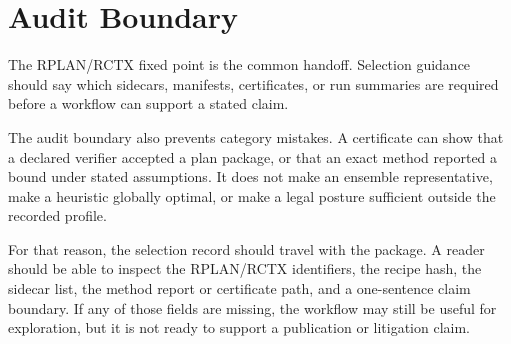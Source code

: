 \section{Audit Boundary}

The RPLAN/RCTX fixed point is the common handoff. Selection guidance should say
which sidecars, manifests, certificates, or run summaries are required before a
workflow can support a stated claim.

The audit boundary also prevents category mistakes. A certificate can show that
a declared verifier accepted a plan package, or that an exact method reported a
bound under stated assumptions. It does not make an ensemble representative,
make a heuristic globally optimal, or make a legal posture sufficient outside
the recorded profile.

For that reason, the selection record should travel with the package. A reader
should be able to inspect the RPLAN/RCTX identifiers, the recipe hash, the
sidecar list, the method report or certificate path, and a one-sentence claim
boundary. If any of those fields are missing, the workflow may still be useful
for exploration, but it is not ready to support a publication or litigation
claim.
